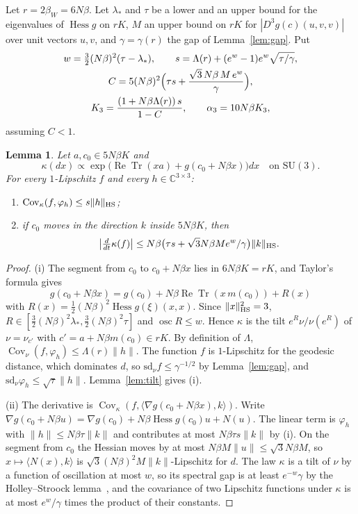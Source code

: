 \documentclass[11pt]{amsart}
\newtheorem{lemma}[theorem]{Lemma}
\theoremstyle{definition}
\theoremstyle{remark}
\numberwithin{equation}{section}
\newcommand{\C}{\mathbb{C}}
\newcommand{\SU}{\mathrm{SU}}
\newcommand{\ReTr}{\operatorname{Re}\operatorname{Tr}}
\newcommand{\Hess}{\operatorname{Hess}}
\newcommand{\Cov}{\operatorname{Cov}}
\newcommand{\ip}[2]{\langle #1,#2\rangle}
\begin{document}
Let $r=2\beta_W=6N\beta$. Let $\lambda_*$ and $\tau$ be a lower and an upper
bound for the eigenvalues of $\Hess g$ on $rK$, $M$ an upper bound on $rK$
for $|D^3g(c)(u,v,v)|$ over unit vectors $u,v$, and $\gamma=\gamma(r)$ the
gap of Lemma~\ref{lem:gap}. Put
\begin{equation}\label{eq:blockconst3}
\begin{gathered}
w=\tfrac32(N\beta)^2(\tau-\lambda_*),\qquad s=\Lambda(r)+(e^w-1)e^w
\sqrt{\tau/\gamma},\\
C=5(N\beta)^2\Bigl(\tau s+\frac{\sqrt3\,N\beta\,M\,e^w}{\gamma}\Bigr),\\
K_3=\frac{(1+N\beta\Lambda(r))\,s}{1-C},\qquad\alpha_3=10N\beta K_3,
\end{gathered}
\end{equation}
assuming $C<1$.

\begin{lemma}\label{lem:onesite3}
Let $a,c_0\in5N\beta K$ and
\[
\kappa(dx)\propto\exp\bigl(\ReTr(xa)+g(c_0+N\beta x)\bigr)dx\quad\text{on }
\SU(3).
\]
For every $1$-Lipschitz $f$ and every $h\in\C^{3\times3}$:
\begin{enumerate}[label=\textup{(\roman*)},leftmargin=*]
\item $\Cov_\kappa(f,\varphi_h)\le s\|h\|_{\rm HS}$;
\item if $c_0$ moves in the direction $k$ inside $5N\beta K$, then
\[
\bigl|\tfrac{d}{dt}\kappa(f)\bigr|\le N\beta\bigl(\tau s+\sqrt3N\beta
Me^w/\gamma\bigr)\|k\|_{\rm HS}.
\]
\end{enumerate}
\end{lemma}

\begin{proof}
(i) The segment from $c_0$ to $c_0+N\beta x$ lies in $6N\beta K=rK$, and
Taylor's formula gives
\[
g(c_0+N\beta x)=g(c_0)+N\beta\ReTr(x\,m(c_0))+R(x)
\]
with $R(x)=\frac12(N\beta)^2\Hess g(\xi)(x,x)$. Since $\|x\|_{\rm HS}^2=3$,
$R\in[\frac32(N\beta)^2\lambda_*,\frac32(N\beta)^2\tau]$ and $\operatorname{osc}
R\le w$. Hence $\kappa$ is the tilt $e^R\nu/\nu(e^R)$ of $\nu=\nu_{c'}$ with
$c'=a+N\beta m(c_0)\in rK$. By definition of $\Lambda$, $\Cov_\nu(f,\varphi_h)
\le\Lambda(r)\|h\|$. The function $f$ is $1$-Lipschitz for the geodesic
distance, which dominates $d$, so $\mathrm{sd}_\nu f\le\gamma^{-1/2}$ by
Lemma~\ref{lem:gap}, and $\mathrm{sd}_\nu\varphi_h\le\sqrt\tau\|h\|$.
Lemma~\ref{lem:tilt} gives (i).

(ii) The derivative is $\Cov_\kappa(f,\ip{\nabla g(c_0+N\beta x)}k)$. Write
$\nabla g(c_0+N\beta u)=\nabla g(c_0)+N\beta\Hess g(c_0)u+N(u)$. The linear
term is $\varphi_h$ with $\|h\|\le N\beta\tau\|k\|$ and contributes at most
$N\beta\tau s\|k\|$ by (i). On the segment from $c_0$ the Hessian moves by at
most $N\beta M\|u\|\le\sqrt3N\beta M$, so $x\mapsto\ip{N(x)}k$ is
$\sqrt3(N\beta)^2M\|k\|$-Lipschitz for $d$. The law $\kappa$ is a tilt of
$\nu$ by a function of oscillation at most $w$, so its spectral gap is at
least $e^{-w}\gamma$ by the Holley--Stroock lemma~\cite{HS87}, and the
covariance of two Lipschitz functions under $\kappa$ is at most $e^w/\gamma$
times the product of their constants.
\end{proof}
\end{document}
